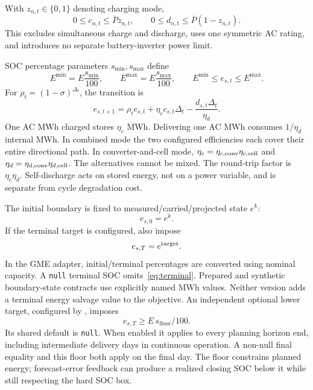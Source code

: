 \documentclass[11pt,a4paper]{article}
\begin{document}
With $z_{n,t}\in\{0,1\}$ denoting charging mode,
\begin{equation}\label{eq:power}
 0\le c_{n,t}\le\overline P z_{n,t},\qquad
 0\le d_{n,t}\le\overline P(1-z_{n,t}).
\end{equation}
This excludes simultaneous charge and discharge, uses one symmetric AC rating,
and introduces no separate battery-inverter power limit.

SOC percentage parameters $s_{\min},s_{\max}$ define
\begin{equation}
 E^{\min}=E\frac{s_{\min}}{100},\qquad
 E^{\max}=E\frac{s_{\max}}{100},\qquad
 E^{\min}\le e_{s,t}\le E^{\max}.
\end{equation}
For $\rho_t=(1-\sigma)^{\Delta_t}$, the transition is
\begin{equation}\label{eq:soc}
 e_{s,t+1}=\rho_t e_{s,t}
    +\eta_c c_{s,t}\Delta_t-\frac{d_{s,t}\Delta_t}{\eta_d}.
\end{equation}
One AC MWh charged stores $\eta_c$ MWh. Delivering one AC MWh consumes
$1/\eta_d$ internal MWh. In combined mode the two configured efficiencies each
cover their entire directional path. In converter-and-cell mode,
$\eta_c=\eta_{c,\rm conv}\eta_{c,\rm cell}$ and
$\eta_d=\eta_{d,\rm conv}\eta_{d,\rm cell}$. The alternatives cannot be mixed.
The round-trip factor is $\eta_c\eta_d$. Self-discharge acts on stored energy,
not on a power variable, and is separate from cycle degradation cost.

The initial boundary is fixed to measured/carried/projected state $e^k$:
\begin{equation}
 e_{s,0}=e^k.
\end{equation}
If the terminal target is configured, also impose
\begin{equation}\label{eq:terminal}
 e_{s,T}=e^{\rm target}.
\end{equation}
In the GME adapter, initial/terminal percentages are converted using nominal
capacity. A \texttt{null} terminal SOC omits~\eqref{eq:terminal}. Prepared and
synthetic boundary-state contracts use explicitly named MWh values. Neither
version adds a terminal energy salvage value to the objective.
An independent optional lower target, configured by
, imposes
\begin{equation}\label{eq:terminal-minimum}
 e_{s,T}\ge E\,s_{\mathrm{floor}}/100.
\end{equation}
Its shared default is \texttt{null}. When enabled it applies to every planning
horizon end, including intermediate delivery days in continuous operation.
A non-null final equality and this floor both apply on the final day. The
floor constrains planned energy; forecast-error feedback can produce a
realized closing SOC below it while still respecting the hard SOC box.
\end{document}
